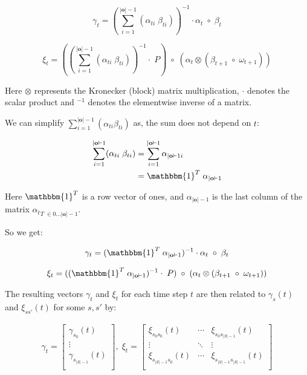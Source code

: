 \begin{equation}
    {\gamma}_t = (\sum_{i=1}^{|\mathbf{o}|-1} (\alpha_{t i} \;\beta_{t i}))^{-1} \cdot \alpha_t \; \circ \; \beta_t
    \label{eq:gamma-matrix}
\end{equation}

\begin{equation}
    {\xi}_t = ((\sum_{i=1}^{|\mathbf{o}|-1} (\alpha_{t i} \; \beta_{t i}))^{-1} \cdot \; {P}) \; \circ \;(\alpha_t \otimes (\beta_{t+1} \; \circ \; {\omega}_{t+1}))
    \label{eq:xi-matrix}
\end{equation}

Here $\otimes$ represents the Kronecker (block) matrix multiplication, $\cdot$ denotes the scalar product and $^{-1}$ denotes the elementwise inverse of a matrix.

We can simplify $\sum_{i=1}^{|\mathbf{o}|-1} (\alpha_{t i} \beta_{t i})$ as, the sum does not depend on $t$:

\begin{align}
    \sum_{i=1}^{|\mathbf{o}|-1} (\alpha_{t i} \; \beta_{t i}) &= \sum_{i=1}^{|\mathbf{o}|-1} \alpha_{|\mathbf{o}|-1 i} \\
    &= \mathbbm{1}^T \; \alpha_{|\mathbf{o}|-1}
\end{align}

Here $\mathbbm{1}^T$ is a row vector of ones, and $\alpha_{|\mathbf{o}|-1}$ is the last column of the matrix ${\alpha_t}_{T \;\in 0\dots|\mathbf{o}|-1}$.

So we get:

\begin{equation}
    {\gamma}_t = (\mathbbm{1}^T \; \alpha_{|\mathbf{o}|-1})^{-1} \cdot \alpha_t \; \circ \; \beta_t
    \label{eq:gamma-matrix-ones}
\end{equation}

\begin{equation}
    {\xi}_t = ((\mathbbm{1}^T \; \alpha_{|\mathbf{o}|-1})^{-1} \cdot \; {P}) \; \circ \;(\alpha_t \otimes (\beta_{t+1} \; \circ \; {\omega}_{t+1}))
    \label{eq:xi-matrix-ones}
\end{equation}

The resulting vectors ${\gamma}_t$ and ${\xi}_t$ for each time step $t$ are then related to $\gamma_s(t)$ and $\xi_{ss'}(t)$ for some $s, s'$ by:

\begin{align}
    {\gamma}_t = \begin{bmatrix}
        \gamma_{s_0}(t)       \\
        \vdots                \\
        \gamma_{s_{|S|-1}}(t) \\
    \end{bmatrix}, \;
    {\xi}_t = \begin{bmatrix}
        \xi_{s_0 s_0}(t)      & \cdots & \xi_{s_0 s_{|S|-1}}(t)      \\
        \vdots                & \ddots & \vdots                      \\
        \xi_{s_{|S|-1}s_0}(t) & \cdots & \xi_{s_{|S|-1}s_{|S|-1}}(t) \\
    \end{bmatrix}
\end{align}

